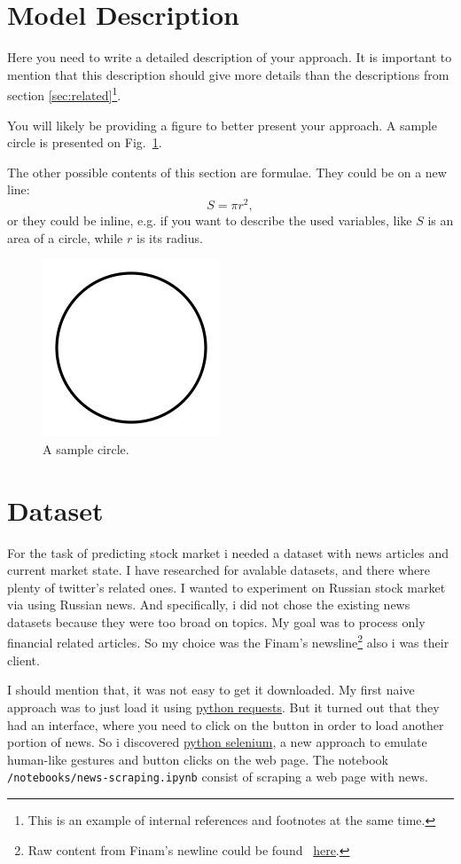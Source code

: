 \documentclass{article}
\begin{document}
\section{Model Description}
Here you need to write a detailed description of your approach. It is important to mention that this description should give more details than the descriptions from section \ref{sec:related}\footnote{This is an example of internal references and footnotes at the same time.}. 

You will likely be providing a figure to better present your approach. A sample circle is presented on Fig.~\ref{fig:circle}.

The other possible contents of this section are formulae. They could be on a new line:
$$S=\pi r^2,$$
or they could be inline, e.g. if you want to describe the used variables, like $S$ is an area of a circle, while $r$ is its radius. 

\begin{figure}[!tbh]
    \centering
    \includegraphics[width=0.3\linewidth]{circle.png}
    \caption{A sample circle.}
    \label{fig:circle}
\end{figure}

\section{Dataset}

For the task of predicting stock market i needed a dataset with news articles and current market state.
I have researched for avalable datasets, and there where plenty of twitter's related ones.
I wanted to experiment on Russian stock market via using Russian news. 
And specifically, i did not chose the existing news datasets because they were too broad on topics. My goal was to process only financial related articles.
So my choice was the Finam's newsline\footnote{Raw content from Finam's newline could be found ~\href{https://www.finam.ru/publications/selection/united/}{here}.} also i was their client.

I should mention that, it was not easy to get it downloaded. 
My first naive approach was to just load it using \href{https://pypi.org/project/requests/}{python requests}. But it turned out that they had an interface, where you need to click on the button in order to load another portion of news. So i discovered \href{https://pypi.org/project/selenium/}{python selenium}, a new approach to emulate human-like gestures and button clicks on the web page.
The notebook \texttt{/notebooks/news-scraping.ipynb} consist of scraping a web page with news.
\end{document}
